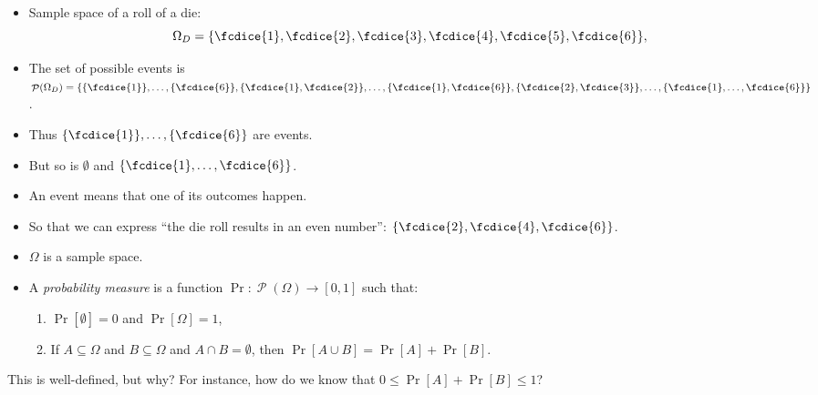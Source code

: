 \documentclass{beamer}
\DeclareMathOperator{\powerset}{\mathcal{P}}
\begin{document}
\begin{frame}
  \begin{example}
    \begin{itemize}
      \item Sample space of a roll of a die: \[\Omega_D = \{\fcdice{1}, 
          \fcdice{2}, \fcdice{3}, \fcdice{4}, \fcdice{5}, \fcdice{6}\},\]
        
        \pause{}

      \item The set of possible events is \(\powerset(\Omega_D) 
          = \{\{\fcdice{1}\}, \ldots, \{\fcdice{6}\}, \{\fcdice{1}, 
          \fcdice{2}\}, \ldots, \{\fcdice{1}, \fcdice{6}\}, 
          \{\fcdice{2},\fcdice{3}\}, \ldots, 
          \{\fcdice{1},\ldots,\fcdice{6}\}\}\).
      \item Thus \(\{\fcdice{1}\},\ldots,\{\fcdice{6}\}\) are events.
      \item But so is \(\emptyset\) and \(\{\fcdice{1}, \ldots, \fcdice{6}\}\).

        \pause{}

      \item An event means that one of its outcomes happen.
      \item So that we can express \enquote{the die roll results in an even 
          number}: \(\{\fcdice{2}, \fcdice{4}, \fcdice{6}\}\).
    \end{itemize}
  \end{example}
\end{frame}

\begin{frame}
  \begin{definition}
    \begin{itemize}
      \item \(\Omega\) is a sample space.
      \item A \emph{probability measure} is a function \(\Pr\colon 
          \powerset(\Omega)\to [0,1]\) such that:
        \begin{enumerate}
          \item \(\Pr[ \emptyset ] = 0\) and \(\Pr[ \Omega ] = 1\),
          \item If \(A\subseteq \Omega\) and \(B\subseteq \Omega\) and \(A\cap 
              B = \emptyset\), then \(\Pr[A\cup B] = \Pr[A] + \Pr[B]\).
        \end{enumerate}
    \end{itemize}
  \end{definition}

  \begin{exercise}
    This is well-defined, but why?
    For instance, how do we know that \(0\leq \Pr[A] + \Pr[B]\leq 1\)?
  \end{exercise}
\end{frame}
\end{document}

